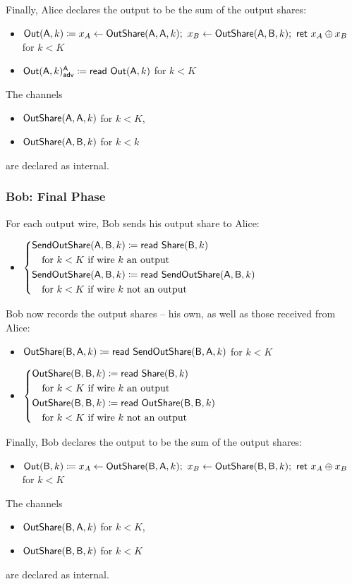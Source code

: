 Finally, Alice declares the output to be the sum of the output shares:
\begin{itemize}
\item $\mathsf{Out}(\mathsf{A},k) \coloneqq x_A \leftarrow \mathsf{OutShare}(\mathsf{A},\mathsf{A},k); \ x_B \leftarrow \mathsf{OutShare}(\mathsf{A},\mathsf{B},k); \ \mathsf{ret} \ x_A \oplus x_B$ for $k < K$
\item {\color{blue} $\mathsf{Out}(\mathsf{A},k)^{\mathsf{A}}_{\mathsf{adv}} \coloneqq \mathsf{read} \ \mathsf{Out}(\mathsf{A},k)$ for $k < K$}
\end{itemize}
The channels
\begin{itemize}
\item $\mathsf{OutShare}(\mathsf{A},\mathsf{A},k)$ for $k < K$,
\item $\mathsf{OutShare}(\mathsf{A},\mathsf{B},k)$ for $k < k$
\end{itemize}
are declared as internal.

\subsubsection{Bob: Final Phase}
For each output wire, Bob sends his output share to Alice:
\begin{itemize}
\item $\begin{cases*} \SendOutShare(\A,\B,k) \coloneqq \read{\Share(\B,k)} \\ \hspace{10pt} \text{for $k < K$ if wire $k$ an output} \\ \SendOutShare(\A,\B,k) \coloneqq \read{\SendOutShare(\A,\B,k)} \\ \hspace{10pt} \text{for $k < K$ if wire $k$ not an output} \end{cases*}$
\end{itemize}
Bob now records the output shares -- his own, as well as those received from Alice:
\begin{itemize}
\item $\mathsf{OutShare}(\mathsf{B},\mathsf{A},k) \coloneqq \mathsf{read} \ \mathsf{SendOutShare}(\mathsf{B},\mathsf{A},k)$ for $k < K$
\item $\begin{cases*} \OutShare(\B,\B,k) \coloneqq \read{\Share(\B,k)} \\ \hspace{10pt} \text{for $k < K$ if wire $k$ an output} \\ \OutShare(\B,\B,k) \coloneqq \read{\OutShare(\B,\B,k)} \\ \hspace{10pt} \text{for $k < K$ if wire $k$ not an output} \end{cases*}$
\end{itemize}
Finally, Bob declares the output to be the sum of the output shares:
\begin{itemize}
\item $\mathsf{Out}(\mathsf{B},k) \coloneqq x_A \leftarrow \mathsf{OutShare}(\mathsf{B},\mathsf{A},k); \ x_B \leftarrow \mathsf{OutShare}(\mathsf{B},\mathsf{B},k); \ \mathsf{ret} \ x_A \oplus x_B$ for $k < K$
\end{itemize}
The channels
\begin{itemize}
\item $\mathsf{OutShare}(\mathsf{B},\mathsf{A},k)$ for $k < K$,
\item $\mathsf{OutShare}(\mathsf{B},\mathsf{B},k)$ for $k < K$
\end{itemize}
are declared as internal.


